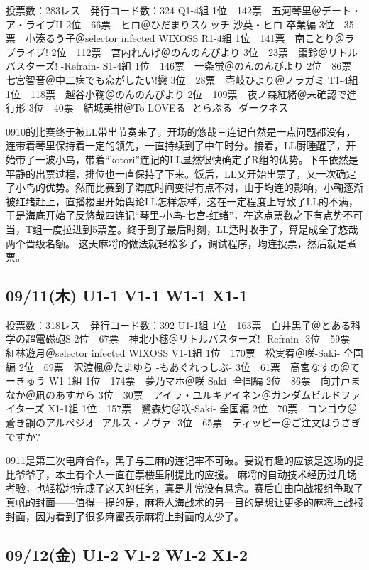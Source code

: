 	投票数：283レス　発行コード数：324
	Q1-4組
	1位　142票　五河琴里＠デート・ア・ライブII
	2位　66票　ヒロ＠ひだまりスケッチ 沙英・ヒロ 卒業編
	3位　35票　小湊るう子＠selector infected WIXOSS
	R1-4組
	1位　141票　南ことり＠ラブライブ!
	2位　112票　宮内れんげ＠のんのんびより
	3位　23票　棗鈴＠リトルバスターズ! -Refrain-
	S1-4組
	1位　146票　一条蛍＠のんのんびより
	2位　86票　七宮智音＠中二病でも恋がしたい!戀
	3位　28票　壱岐ひより＠ノラガミ
	T1-4組
	1位　118票　越谷小鞠＠のんのんびより
	2位　109票　夜ノ森紅緒＠未確認で進行形
	3位　40票　結城美柑＠To LOVEる -とらぶる- ダークネス

0910的比赛终于被LL带出节奏来了。开场的悠哉三连记自然是一点问题都没有，连带着琴里保持着一定的领先，一直持续到了中午时分。接着，LL厨睡醒了，开始带了一波小鸟，带着“kotori”连记的LL显然很快确定了R组的优势。下午依然是平静的出票过程，排位也一直保持了下来。饭后，LL又开始出票了，又一次确定了小鸟的优势。然而比赛到了海底时间变得有点不对，由于均连的影响，小鞠逐渐被红绪赶上，直播楼里开始舆论LL怎样怎样，这在一定程度上导致了LL的不满，于是海底开始了反悠哉四连记“琴里-小鸟-七宫-红绪”，在这点票数之下有点势不可当，T组一度拉进到5票差。终于到了最后时刻，LL适时收手了，算是成全了悠哉两个晋级名额。
这天麻将的做法就轻松多了，调试程序，均连投票，然后就是煮票。

\subsection{09/11(木) U1-1 V1-1 W1-1 X1-1}

	投票数：318レス　発行コード数：392
	U1-1組
	1位　163票　白井黒子＠とある科学の超電磁砲S
	2位　67票　神北小毬＠リトルバスターズ! -Refrain-
	3位　59票　紅林遊月＠selector infected WIXOSS
	V1-1組
	1位　170票　松実宥＠咲-Saki- 全国編
	2位　69票　沢渡楓＠たまゆら -もあぐれっしぶ-
	3位　61票　高宮なすの＠てーきゅう
	W1-1組
	1位　174票　夢乃マホ＠咲-Saki- 全国編
	2位　86票　向井戸まなか＠凪のあすから
	3位　30票　アイラ・ユルキアイネン＠ガンダムビルドファイターズ
	X1-1組
	1位　157票　鷺森灼＠咲-Saki- 全国編
	2位　70票　コンゴウ＠蒼き鋼のアルペジオ -アルス・ノヴァ-
	3位　65票　ティッピー＠ご注文はうさぎですか?

0911是第三次电麻合作，黑子与三麻的连记牢不可破。要说有趣的应该是这场的提比爷爷了，本土有个人一直在票楼里刷提比的应援。
麻将的自动技术经历过几场考验，也轻松地完成了这天的任务，真是非常没有悬念。赛后自由向战报组争取了真帆的封面——值得一提的是，麻将人海战术的另一目的是想让更多的麻将上战报封面，因为看到了很多麻蜜表示麻将上封面的太少了。

\subsection{09/12(金) U1-2 V1-2 W1-2 X1-2}

